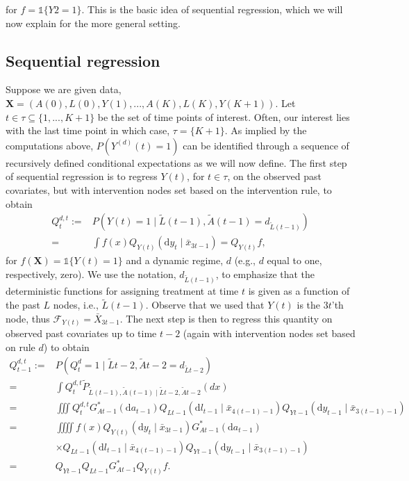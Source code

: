 \documentclass{article}
\newcommand{\A}{A}
\renewcommand{\L}{L}
\newcommand{\Y}{Y}
\newcommand{\Ystar}[2]{Y^{(#1)}(#2)}
\newcommand{\Lbar}{\tilde{L}}
\newcommand{\Abar}{\tilde{A}}
\renewcommand{\d}{\ensuremath{\mathrm{d}}}
\begin{document}
for $f = \mathds{1}\{\Y{2}=1\}$. This is the basic idea of sequential
regression, which we will now explain for the more general setting.
\subsection{Sequential regression}
Suppose we are given data,
$\textbf{X}=(\A(0),\L(0),\Y(1),...,\A(K),\L(K),\Y(K+1))$. Let
$t\in\tau\subseteq\{1,...,K+1\}$ be the set of time points of
interest. Often, our interest lies with the last time point in which
case, $\tau=\{K+1\}$. As implied by the computations above,
$P(\Ystar{d}{t}=1)$ can be identified through a sequence of
recursively defined conditional expectations as we will now
define. The first step of sequential regression is to regress $\Y(t)$,
for $t\in\tau$, on the observed past covariates, but with intervention
nodes set based on the intervention rule, to obtain
\begin{align*}
        Q_t^{d,t}:=&P(\Y(t)=1\mid \Lbar(t-1),\Abar(t-1)=d_{\Lbar(t-1)})\\
        =&\int f(x)Q_{\Y(t)}(\d y_t\mid \bar{x}_{3t-1})=Q_{\Y(t)}f,\tag{Step 1}
\end{align*} 
for $f(\textbf{X})=\mathds{1}\{\Y(t)=1\}$ and a dynamic regime, $d$
(e.g., $d$ equal to one, respectively, zero). We use the notation,
$d_{\Lbar(t-1)}$, to emphasize that the deterministic functions for
assigning treatment at time $t$ is given as a function of the past $L$
nodes, i.e., $\Lbar(t-1)$. Observe that we used that $Y(t)$ is the
$3t$'th node, thus $\mathcal{F}_{\Y(t)}=\bar{X}_{3t-1}$. The next step
is then to regress this quantity on observed past covariates up to
time $t-2$ (again with intervention nodes set based on rule $d$) to
obtain
\begin{align*}
        Q_{t-1}^{d,t}:=&P(Q_{t}^d=1\mid \Lbar{t-2},\Abar{t-2}=d_{\Lbar{t-2}})\\
        =&\int Q_t^{d,t}\tilde{P}_{\Lbar(t-1),\Abar(t-1)\mid \Lbar{t-2},\Abar{t-2}}(dx)\\
        =&\iiint Q_t^{d,t}G^*_{\A{t-1}}(\d a_{t-1})Q_{\L{t-1}}(\d l_{t-1}\mid \bar{x}_{4(t-1)-1})Q_{\Y{t-1}}(\d y_{t-1}\mid \bar{x}_{3(t-1)-1})\\
        =&\iiiint f(x) Q_{\Y(t)}(\d y_t\mid \bar{x}_{3t-1})G^*_{\A{t-1}}(\d a_{t-1})\\
        &\times Q_{\L{t-1}}(\d l_{t-1}\mid \bar{x}_{4(t-1)-1})Q_{\Y{t-1}}(\d y_{t-1}\mid \bar{x}_{3(t-1)-1})\\
        =&Q_{\Y{t-1}}Q_{\L{t-1}}G^*_{\A{t-1}}Q_{\Y(t)}f.\tag{Step 2}
\end{align*}
\end{document}
